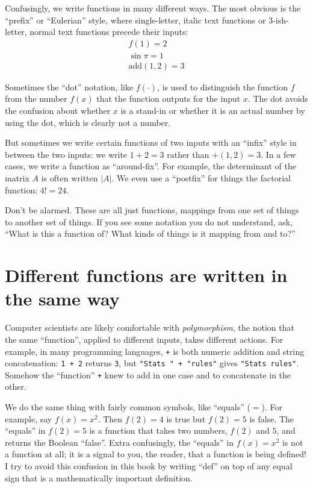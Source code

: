 Confusingly, we write functions in many different ways. The most obvious is the
``prefix'' or ``Eulerian'' style, where single-letter, italic text functions or
3-ish-letter, normal text functions precede their inputs:
\begin{gather*}
f(1) = 2 \\
\sin \pi = 1 \\
\mathrm{add}(1, 2) = 3
\end{gather*}



Sometimes the ``dot'' notation, like $f(\cdot)$, is used to distinguish the
function $f$ from the number $f(x)$ that the function outputs for the input
$x$. The dot avoids the confusion about whether $x$ is a stand-in or whether it
is an actual number by using the dot, which is clearly not a number.

But sometimes we write certain functions of two inputs with an ``infix'' style
in between the two inputs: we write $1 + 2 = 3$ rather than $\mathord{+}(1, 2)
= 3$. In a few cases, we write a function as ``around-fix''. For example, the
determinant of the matrix $A$ is often written $|A|$. We even use a ``postfix''
for things the factorial function: $4! = 24$.

Don't be alarmed. These are all just functions, mappings from one set of things
to another set of things. If you see some notation you do not understand, ask,
``What is this a function of? What kinds of things is it mapping from and to?''

\section{Different functions are written in the same way}

Computer scientists are likely comfortable with \emph{polymorphism}, the
notion that the same ``function'', applied to different inputs, takes different
actions. For example, in many programming languages, \texttt{+} is both
numeric addition and string concatenation: \texttt{1 + 2} returns \texttt{3},
but \texttt{"Stats " + "rules"} gives \texttt{"Stats rules"}. Somehow the
``function'' \texttt{+} knew to add in one case and to concatenate in the
other.

We do the same thing with fairly common symbols, like ``equals'' ($=$). For
example, say $f(x) = x^2$. Then $f(2) = 4$ is true but $f(2) = 5$ is false.
The ``equals'' in $f(2) = 5$ is a function that takes two numbers, $f(2)$ and
$5$, and returns the Boolean ``false''. Extra confusingly, the ``equals'' in
$f(x) = x^2$ is not a function at all; it is a signal to you, the reader, that
a function is being defined! I try to avoid this confusion in this book by
writing ``def'' on top of any equal sign that is a mathematically important
definition.

